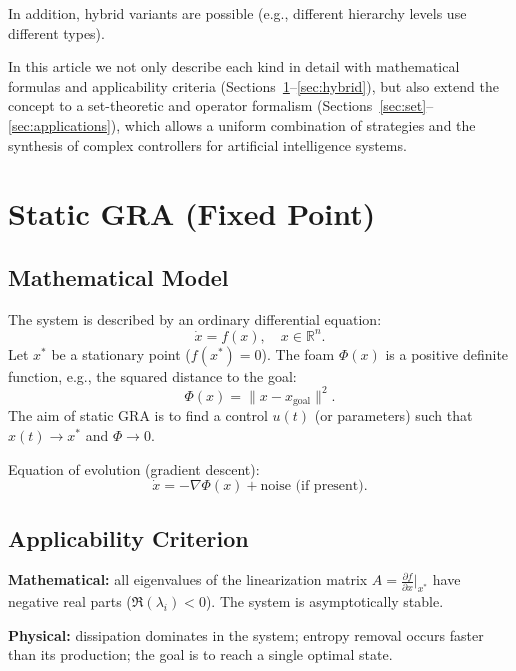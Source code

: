 \documentclass[12pt,a4paper]{article}
\newcommand{\R}{\mathbb{R}}
\begin{document}
In addition, hybrid variants are possible (e.g., different hierarchy levels use different types).

In this article we not only describe each kind in detail with mathematical formulas and applicability criteria (Sections~\ref{sec:static}--\ref{sec:hybrid}), but also extend the concept to a set-theoretic and operator formalism (Sections~\ref{sec:set}--\ref{sec:applications}), which allows a uniform combination of strategies and the synthesis of complex controllers for artificial intelligence systems.

\section{Static GRA (Fixed Point)}
\label{sec:static}

\subsection{Mathematical Model}

The system is described by an ordinary differential equation:
\begin{equation}
    \dot{x} = f(x), \quad x \in \R^n.
\end{equation}
Let $x^*$ be a stationary point ($f(x^*) = 0$). The foam $\Phi(x)$ is a positive definite function, e.g., the squared distance to the goal:
\begin{equation}
    \Phi(x) = \| x - x_{\text{goal}} \|^2.
\end{equation}
The aim of static GRA is to find a control $u(t)$ (or parameters) such that $x(t) \to x^*$ and $\Phi \to 0$.

Equation of evolution (gradient descent):
\begin{equation}
    \dot{x} = -\nabla \Phi(x) + \text{noise (if present)}.
\end{equation}

\subsection{Applicability Criterion}

\textbf{Mathematical:} all eigenvalues of the linearization matrix $A = \frac{\partial f}{\partial x}\big|_{x^*}$ have negative real parts ($\Re(\lambda_i) < 0$). The system is asymptotically stable.

\textbf{Physical:} dissipation dominates in the system; entropy removal occurs faster than its production; the goal is to reach a single optimal state.
\end{document}
